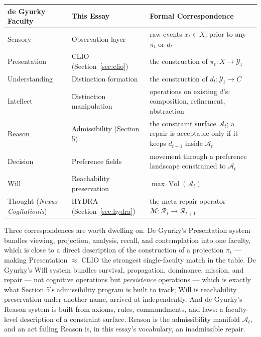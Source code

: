 \documentclass[11pt]{article}
\theoremstyle{plain}
\theoremstyle{definition}
\theoremstyle{remark}
\begin{document}
\begin{center}
\renewcommand{\arraystretch}{1.3}
\begin{tabular}{p{3.1cm}p{3.3cm}p{5.7cm}}
\toprule
\textbf{de Gyurky Faculty} & \textbf{This Essay} & \textbf{Formal Correspondence} \\
\midrule
Sensory & Observation layer & raw events $x_t \in X$, prior to any $\pi_t$ or $d_t$ \\
Presentation & CLIO (Section~\ref{sec:clio}) & the construction of $\pi_t : X \to \mathcal{Y}_t$ \\
Understanding & Distinction formation & the construction of $d_t : \mathcal{Y}_t \to C$ \\
Intellect & Distinction manipulation & operations on existing $d$'s: composition, refinement, abstraction \\
Reason & Admissibility (Section 5) & the constraint surface $\mathcal{A}_t$; a repair is acceptable only if it keeps $d_{t+1}$ inside $\mathcal{A}_t$ \\
Decision & Preference fields & movement through a preference landscape constrained to $\mathcal{A}_t$ \\
Will & Reachability preservation & $\max \operatorname{Vol}(\mathcal{A}_t)$ \\
Thought (\emph{Nexus Cogitationis}) & HYDRA (Section~\ref{sec:hydra}) & the meta-repair operator $\mathcal{M} : \mathcal{R}_t \to \mathcal{R}_{t+1}$ \\
\bottomrule
\end{tabular}
\end{center}

Three correspondences are worth dwelling on. De Gyurky's Presentation system bundles viewing, projection, analysis, recall, and contemplation into one faculty, which is close to a direct description of the construction of a projection $\pi_t$ --- making Presentation $\approx$ CLIO the strongest single-faculty match in the table. De Gyurky's Will system bundles survival, propagation, dominance, mission, and repair --- not cognitive operations but \emph{persistence} operations --- which is exactly what Section 5's admissibility program is built to track; Will is reachability preservation under another name, arrived at independently. And de Gyurky's Reason system is built from axioms, rules, commandments, and laws: a faculty-level description of a constraint surface. Reason is the admissibility manifold $\mathcal{A}_t$, and an act failing Reason is, in this essay's vocabulary, an inadmissible repair.
\end{document}
